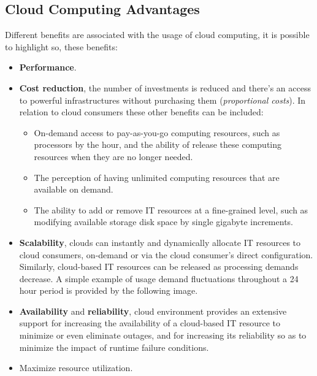 \subsection{Cloud Computing Advantages}
Different benefits are associated with the usage of cloud computing, it is possible to highlight so, these benefits:
\begin{itemize}
	\item \textbf{Performance}.
	\item \textbf{Cost reduction}, the number of investments is reduced and there's an access to powerful infrastructures without purchasing them (\textit{proportional costs}). In relation to cloud consumers these other benefits can be included:
	\begin{itemize}
		\item On-demand access to pay-as-you-go computing resources, such as processors by the hour, and the ability of release these computing resources when they are no longer needed.
		\item The perception of having unlimited computing resources that are available on demand.
		\item The ability to add or remove IT resources at a fine-grained level, such as modifying available storage disk space by single gigabyte increments.
	\end{itemize}
	\item \textbf{Scalability}, clouds can instantly and dynamically allocate IT resources to cloud consumers, on-demand or via the cloud consumer’s direct configuration. Similarly, cloud-based IT resources can be released as processing demands decrease. A simple example of usage demand fluctuations throughout a 24 hour period is provided by the following image.
	\item \textbf{Availability} and \textbf{reliability}, cloud environment provides an extensive support for increasing the availability of a cloud-based IT resource to minimize or even eliminate outages, and for increasing its reliability so as to minimize the impact of runtime failure conditions.
	\item Maximize resource utilization.
\end{itemize}

